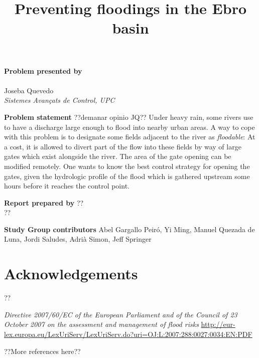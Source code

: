 \documentclass[a4paper,12pt,english]{article}
\title{Preventing floodings in the Ebro basin}
\begin{document}
\maketitle

\begin{center}
\textbf{Problem presented by} \\ \ \\ \large Joseba Quevedo \\ \normalsize \textit{Sistemes Avan{\c c}ats de Control, UPC}
\end{center}

\begin{center}
\textbf{Problem statement}
??demanar opinio JQ??
Under heavy rain, some rivers use to have a discharge large enough to flood into
nearby urban areas.
A way to cope with this problem is to designate some fields adjacent to the river as \emph{floodable}:
At a cost, it is allowed to divert part of the flow into these fields by way of large gates
which exist alongside the river. The area of the gate opening can be modified remotely.
One wants to know the best control strategy for opening the gates, given the hydrologic profile
of the flood which is gathered upstream some hours before it reaches the control point.
\end{center}



\begin{center}
\textbf{Report prepared by} ?? \\ ??
\end{center}


\begin{center}
\textbf{Study Group contributors}
Abel Gargallo Peiró,
Yi Ming,
Manuel Quezada de Luna,
Jordi Saludes,
Adri\`a Simon,
Jeff Springer
\end{center}

\newpage


\section*{Acknowledgements}
??

\begin{thebibliography}{99}
\emph{Directive 2007/60/EC of the European Parliament and of the Council of 23 October 2007 on the assessment and management of flood risks}
\url{http://eur-lex.europa.eu/LexUriServ/LexUriServ.do?uri=OJ:L:2007:288:0027:0034:EN:PDF}

??More references here??
\end{thebibliography}
\end{document}
